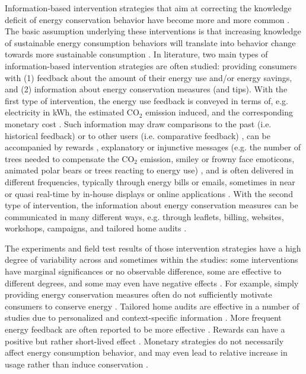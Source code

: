 \documentclass[a4paper]{article}
\begin{document}
Information-based intervention strategies that aim at correcting the knowledge deficit of energy conservation behavior have become more and more common \citep{Delmas2013}. The basic assumption underlying these interventions is that increasing knowledge of sustainable energy consumption behaviors will translate into behavior change towards more sustainable consumption \citep{Schultz2002,Delmas2013}. In literature, two main types of information-based intervention strategies are often studied: providing consumers with (1) feedback about the amount of their energy use and/or energy savings, and (2) information about energy conservation measures (and tips). With the first type of intervention, the energy use feedback is conveyed in terms of, e.g. electricity in kWh, the estimated CO$_{2}$ emission induced, and the corresponding monetary cost \citep{+}. Such information may draw comparisons to the past (i.e. historical feedback) or to other users (i.e. comparative feedback) \citep{+}, can be accompanied by rewards \citep{+}, explanatory or injunctive messages (e.g. the number of trees needed to compensate the CO$_{2}$ emission, smiley or frowny face emoticons, animated polar bears or trees reacting to energy use) \citep{Schultz2007,Mankoff2010, Petkov2011,+}, and is often delivered in different frequencies, typically through energy bills or emails, sometimes in near or quasi real-time by in-house displays or online applications \citep{+}. With the second type of intervention, the information about energy conservation measures can be communicated in many different ways, e.g. through leaflets, billing, websites, workshops, campaigns, and tailored home audits \citep{Abrahamse2005,Delmas2013,+}. 

The experiments and field test results of those intervention strategies have a high degree of variability across and sometimes within the studies: some interventions have marginal significances or no observable difference, some are effective to different degrees, and some may even have negative effects \citep{Abrahamse2005,Delmas2013,+}. For example, simply providing energy conservation measures often do not sufficiently motivate consumers to conserve energy \citep{Delmas2013}. Tailored home audits are effective in a number of studies due to personalized and context-specific information \citep{+}. More frequent energy feedback are often reported to be more effective \citep{+}. Rewards can have a positive but rather short-lived effect \citep{+}. Monetary strategies do not necessarily affect energy consumption behavior, and may even lead to relative increase in usage rather than induce conservation \citep{Delmas2013,Asensio2015}. 
\end{document}
